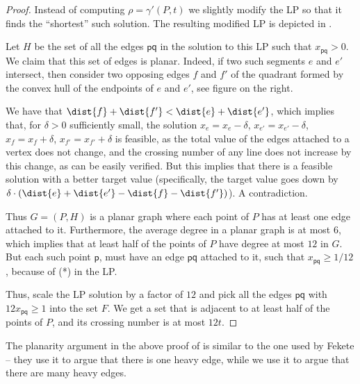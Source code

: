 \documentclass[12pt]{article}
\newcommand{\PntSet}{P}
\newcommand{\pnt}{\mathsf{p}}
\newcommand{\pntA}{\mathsf{q}}
\newcommand{\Term}[1]{\textsf{#1}}
\newcommand{\LP}{\Term{L{}P}\xspace}
\begin{document}
\medskip

\begin{proof}
    Instead of computing $\rho =
    \gamma'(\PntSet, t)$ we slightly modify the \LP so that it
    finds the ``shortest'' such solution.  The resulting modified
    \LP is depicted in 
    .




    Let $H$ be the set of all the edges $\pnt \pntA$ in the solution
    to this \LP such that $x_{\pnt\pntA} > 0$. We claim that this set
    of edges is planar. Indeed, if two such segments $e$ and $e'$
    intersect, then consider two opposing edges $f$ and $f'$ of the
    quadrant formed by the convex hull of the endpoints of $e$ and
    $e'$, see figure on the right.


    
    We have that $\dist{f} + \dist{f'} < \dist{e} + \dist{e'}$, which
    implies that, for $\delta >0$ sufficiently small, the solution
    $x_e = x_e -\delta$, $x_{e'} = x_{e'} -\delta$, $x_{f} = x_{f}
    +\delta$, $x_{f'} = x_{f'} +\delta$ is feasible, as the total
    value of the edges attached to a vertex does not change, and the
    crossing number of any line does not increase by this change, as
    can be easily verified. But this implies that there is a feasible
    solution with a better target value (specifically, the target
    value goes down by $\delta \cdot (\dist{e} + \dist{e'} - \dist{f} -
    \dist{f'})$). A contradiction. 

    
    Thus $G = (\PntSet, H)$ is a planar graph where each point of
    $\PntSet$ has at least one edge attached to it. Furthermore, the
    average degree in a planar graph is at most $6$, which implies
    that at least half of the points of $\PntSet$ have degree at most
    $12$ in $G$. But each such point $\pnt$, must have an edge $\pnt
    \pntA$ attached to it, such that $x_{\pnt \pntA} \geq 1/12$,
    because of (*) in the \LP {}.
    
    Thus, scale the \LP solution by a factor of $12$ and pick all the
    edges $\pnt \pntA$ with $12 x_{\pnt \pntA} \geq 1$ into the set
    $F$. We get a set that is adjacent to at least half of the points
    of $\PntSet$, and its crossing number is at most $12 t$.
\end{proof}    

\medskip

The planarity argument in the above proof of  is
similar to the one used by Fekete \etal \cite{flm-msnmt-08} -- they
use it to argue that there is one heavy edge, while we use it to argue
that there are many heavy edges.
\end{document}
